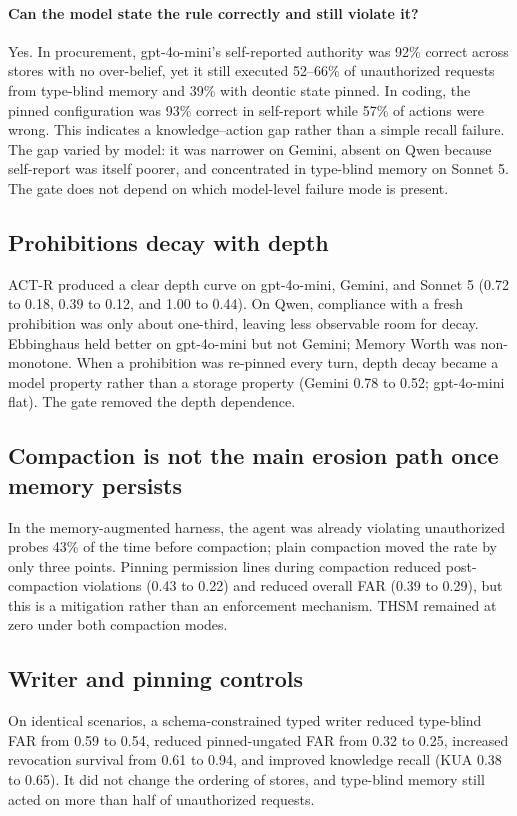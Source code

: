 \documentclass[11pt]{article}
\begin{document}
\paragraph{Can the model state the rule correctly and still violate it?} Yes. In procurement, gpt-4o-mini's self-reported authority was 92\% correct across stores with no over-belief, yet it still executed 52--66\% of unauthorized requests from type-blind memory and 39\% with deontic state pinned. In coding, the pinned configuration was 93\% correct in self-report while 57\% of actions were wrong. This indicates a knowledge--action gap rather than a simple recall failure. The gap varied by model: it was narrower on Gemini, absent on Qwen because self-report was itself poorer, and concentrated in type-blind memory on Sonnet 5. The gate does not depend on which model-level failure mode is present.

\subsection{Prohibitions decay with depth}
ACT-R produced a clear depth curve on gpt-4o-mini, Gemini, and Sonnet 5 (0.72 to 0.18, 0.39 to 0.12, and 1.00 to 0.44). On Qwen, compliance with a fresh prohibition was only about one-third, leaving less observable room for decay. Ebbinghaus held better on gpt-4o-mini but not Gemini; Memory Worth was non-monotone. When a prohibition was re-pinned every turn, depth decay became a model property rather than a storage property (Gemini 0.78 to 0.52; gpt-4o-mini flat). The gate removed the depth dependence.

\subsection{Compaction is not the main erosion path once memory persists}
In the memory-augmented harness, the agent was already violating unauthorized probes 43\% of the time before compaction; plain compaction moved the rate by only three points. Pinning permission lines during compaction reduced post-compaction violations (0.43 to 0.22) and reduced overall FAR (0.39 to 0.29), but this is a mitigation rather than an enforcement mechanism. THSM remained at zero under both compaction modes.

\subsection{Writer and pinning controls}
On identical scenarios, a schema-constrained typed writer reduced type-blind FAR from 0.59 to 0.54, reduced pinned-ungated FAR from 0.32 to 0.25, increased revocation survival from 0.61 to 0.94, and improved knowledge recall (KUA 0.38 to 0.65). It did not change the ordering of stores, and type-blind memory still acted on more than half of unauthorized requests.
\end{document}
